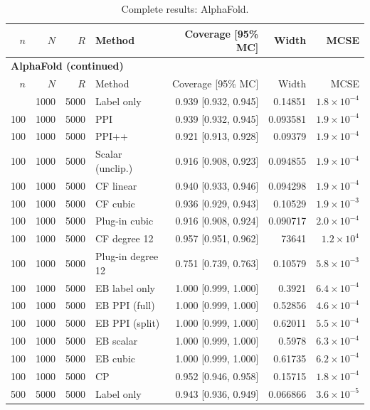 {\setlength{\tabcolsep}{3pt}\begin{longtable}{rrrlrrr}
\caption{Complete results: AlphaFold.}\\
\toprule $n$ & $N$ & $R$ & Method & Coverage [95\% MC] & Width & MCSE \\
\midrule\endfirsthead
\multicolumn{7}{l}{\textbf{AlphaFold (continued)}}\\
\toprule $n$ & $N$ & $R$ & Method & Coverage [95\% MC] & Width & MCSE \\
\midrule\endhead
\bottomrule\endfoot
100 & 1000 & 5000 & Label only & 0.939 [0.932, 0.945] & 0.14851 & $1.8\times 10^{-4}$ \\
100 & 1000 & 5000 & PPI & 0.939 [0.932, 0.945] & 0.093581 & $1.9\times 10^{-4}$ \\
100 & 1000 & 5000 & PPI++ & 0.921 [0.913, 0.928] & 0.09379 & $1.9\times 10^{-4}$ \\
100 & 1000 & 5000 & Scalar (unclip.) & 0.916 [0.908, 0.923] & 0.094855 & $1.9\times 10^{-4}$ \\
100 & 1000 & 5000 & CF linear & 0.940 [0.933, 0.946] & 0.094298 & $1.9\times 10^{-4}$ \\
100 & 1000 & 5000 & CF cubic & 0.936 [0.929, 0.943] & 0.10529 & $1.9\times 10^{-3}$ \\
100 & 1000 & 5000 & Plug-in cubic & 0.916 [0.908, 0.924] & 0.090717 & $2.0\times 10^{-4}$ \\
100 & 1000 & 5000 & CF degree 12 & 0.957 [0.951, 0.962] & 73641 & $1.2\times 10^{4}$ \\
100 & 1000 & 5000 & Plug-in degree 12 & 0.751 [0.739, 0.763] & 0.10579 & $5.8\times 10^{-3}$ \\
100 & 1000 & 5000 & EB label only & 1.000 [0.999, 1.000] & 0.3921 & $6.4\times 10^{-4}$ \\
100 & 1000 & 5000 & EB PPI (full) & 1.000 [0.999, 1.000] & 0.52856 & $4.6\times 10^{-4}$ \\
100 & 1000 & 5000 & EB PPI (split) & 1.000 [0.999, 1.000] & 0.62011 & $5.5\times 10^{-4}$ \\
100 & 1000 & 5000 & EB scalar & 1.000 [0.999, 1.000] & 0.5978 & $6.3\times 10^{-4}$ \\
100 & 1000 & 5000 & EB cubic & 1.000 [0.999, 1.000] & 0.61735 & $6.2\times 10^{-4}$ \\
100 & 1000 & 5000 & CP & 0.952 [0.946, 0.958] & 0.15715 & $1.8\times 10^{-4}$ \\
500 & 5000 & 5000 & Label only & 0.943 [0.936, 0.949] & 0.066866 & $3.6\times 10^{-5}$ \\

\end{longtable}}
